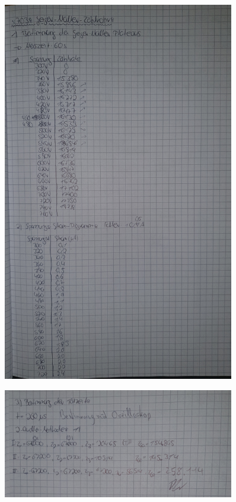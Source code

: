 \begin{figure}[H]
    \centering 
    \includegraphics[width=0.9\textwidth]{content/v703_Laborbuch1.jpg}
\end{figure}

\begin{figure}[H]
    \centering 
    \includegraphics[width=0.9\textwidth]{content/v703_Laborbuch2.jpg}
\end{figure}

%
